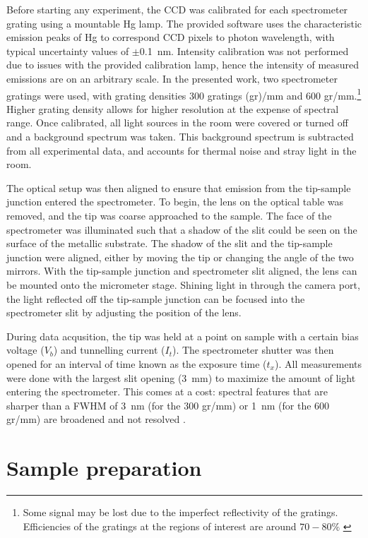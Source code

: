 Before starting any experiment, the \ac{CCD} was calibrated for each spectrometer grating using a mountable Hg lamp. The provided software uses the characteristic emission peaks of Hg to correspond \ac{CCD} pixels to photon wavelength, with typical uncertainty values of $\pm$\SI{0.1}{nm}. Intensity calibration was not performed due to issues with the provided calibration lamp, hence the intensity of measured emissions are on an arbitrary scale. In the presented work, two spectrometer gratings were used, with grating densities 300 gratings (gr)/mm and 600 gr/mm.\footnote{Some signal may be lost due to the imperfect reflectivity of the gratings. Efficiencies of the gratings at the regions of interest are around $70 - 80 \%$ \citep{princetongratings}} Higher grating density allows for higher resolution at the expense of spectral range. Once calibrated, all light sources in the room were covered or turned off and a background spectrum was taken. This background spectrum is subtracted from all experimental data, and accounts for thermal noise and stray light in the room.

The optical setup was then aligned to ensure that emission from the tip-sample junction entered the spectrometer. To begin, the lens on the optical table was removed, and the tip was coarse approached to the sample. The face of the spectrometer was illuminated such that a shadow of the slit could be seen on the surface of the metallic substrate. The shadow of the slit and the tip-sample junction were aligned, either by moving the tip or changing the angle of the two mirrors. With the tip-sample junction and spectrometer slit aligned, the lens can be mounted onto the micrometer stage. Shining light in through the camera port, the light reflected off the tip-sample junction can be focused into the spectrometer slit by adjusting the position of the lens.

During data acqusition, the tip was held at a point on sample with a certain bias voltage ($V_b$) and tunnelling current ($I_t$). The spectrometer shutter was then opened for an interval of time known as the exposure time ($t_x$). All measurements were done with the largest slit opening (\SI{3}{mm}) to maximize the amount of light entering the spectrometer. This comes at a cost: spectral features that are sharper than a \ac{FWHM} of \SI{3}{nm} (for the 300 gr/mm) or \SI{1}{nm} (for the 600 gr/mm) are broadened and not resolved \citep{princetonslit}. 



\section{Sample preparation}

